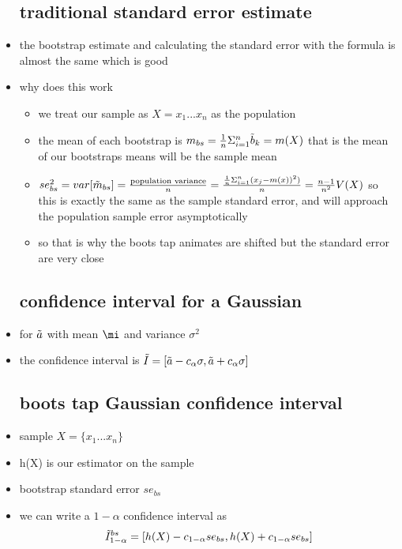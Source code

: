 \documentclass{article}
\begin{document}
\begin{itemize}
\subsection{traditional standard error estimate}
\item the bootstrap estimate and calculating the standard error with the formula is almost the same which is good 
\item why does this work 
\begin{itemize}
    \item we treat our sample as $X=x_1...x_n$ as the population
    \item the mean of each bootstrap is $m_{bs}=\frac{1}{n}\Sigma_{i=1}^{n}\Tilde{b}_k=m(X)$ that is the mean of our bootstraps means will be the sample mean 
    \item $se^2_{bs}=var[\Tilde{m}_{bs}]=\frac{\text{population variance}}{n}=\frac{\frac{1}{n}\Sigma_{i=1}^n(x_j-m(x))^2)}{n}=\frac{n-1}{n^2}V(X)$ so this is exactly the same as the sample standard error, and will approach the population sample error asymptotically
    \item so that is why the boots tap animates are shifted but the standard error are very close
\end{itemize}
\subsection{confidence interval for a Gaussian}
\item for $\Tilde{a}$ with mean $\mi$ and variance $\sigma^2$
\item the confidence interval is $\Tilde{I}=[\Tilde{a}-c_{\alpha}\sigma,\Tilde{a}+c_{\alpha}\sigma ]$
\subsection{boots tap Gaussian confidence interval}
\item sample $X=\{x_1...x_n\}$
\item h(X) is our estimator on the sample
\item bootstrap standard error $se_{bs}$
\item we can write a  $1-\alpha$ confidence interval  as $$\Tilde{I}_{1-\alpha}^{bs}=[h(X)-c_{1-\alpha}se_{bs},h(X)+c_{1-\alpha}se_{bs}]$$

\end{itemize}
\end{document}
